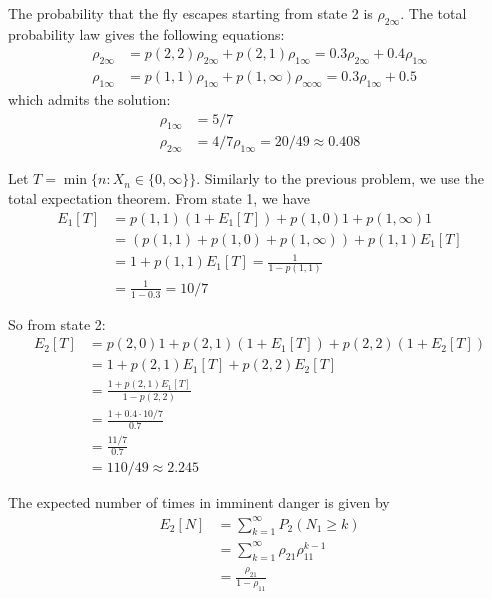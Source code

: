 \documentclass{homework}
\begin{document}
\begin{letterenum}
\item The probability that the fly escapes starting from state 2 is $\rho_{2\infty}$.
The total probability law gives the following equations:
\begin{align*}
    \rho_{2\infty} &= p(2, 2) \rho_{2\infty} + p(2, 1) \rho_{1\infty}
        = 0.3 \rho_{2\infty} + 0.4 \rho_{1\infty} \\
    \rho_{1\infty} &= p(1, 1) \rho_{1\infty} + p(1, \infty) \rho_{\infty\infty}
        = 0.3 \rho_{1\infty} + 0.5
\end{align*}
which admits the solution:
\begin{align*}
    \rho_{1\infty} &= 5/7 \\
    \rho_{2\infty} &= 4/7 \rho_{1\infty} = \boxed{20/49 \approx 0.408}
\end{align*}

\item Let $T = \min\{n: X_n \in\{0, \infty\}\}$. Similarly to the previous
problem, we use the total expectation theorem. From state 1, we have
\begin{align*}
    E_1[T] &= p(1, 1) (1 + E_1[T]) + p(1, 0) 1 + p(1, \infty) 1 \\
        &= (p(1, 1) + p(1, 0) + p(1, \infty)) + p(1, 1) E_1[T] \\
        &= 1 + p(1, 1) E_1[T]  = \frac{1}{1 - p(1, 1)} \\
        &= \frac{1}{1 - 0.3} = 10/7
\end{align*}

So from state 2:
\begin{align*}
    E_2[T] &= p(2, 0) 1 + p(2, 1) ( 1 + E_1[T]) + p(2, 2) (1 + E_2[T]) \\
        &= 1 + p(2, 1) E_1[T] + p(2, 2) E_2[T] \\
        &= \frac{1 + p(2, 1) E_1[T]}{1 - p(2, 2)} \\
        &= \frac{1 + 0.4 \cdot 10/7}{0.7} \\
        &= \frac{11/7}{0.7} \\
        &= \boxed{110/49 \approx 2.245}
\end{align*}

\item The expected number of times in imminent danger is given by
\begin{align*}
    E_2[N] &= \sum_{k=1}^\infty P_2(N_1 \geq k) \\
        &= \sum_{k=1}^\infty \rho_{21} \rho_{11}^{k-1} \\
        &= \frac{\rho_{21}}{1 - \rho_{11}}
\end{align*}


\end{letterenum}
\end{document}
